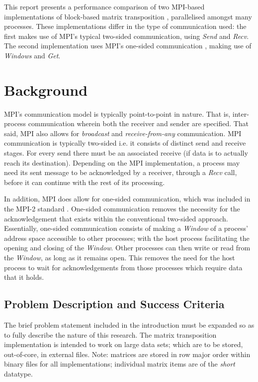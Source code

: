 \documentclass[journal,10pt,a4paper]{IEEEtran}
\begin{document}
This report presents a performance comparison of two MPI-based implementations of block-based matrix transposition \cite{transp}, parallelised amongst many processes. These implementations differ in the type of communication used: the first makes use of MPI's typical two-sided communication, using \textit{Send} and \textit{Recv}. The second implementation uses MPI's one-sided communication \cite{one}, making use of \textit{Windows} and \textit{Get}.

\section{Background}

MPI's communication model is typically point-to-point in nature. That is, inter-process communication wherein both the receiver and sender are specified. That said, MPI also allows for \textit{broadcast} and \textit{receive-from-any} communication. MPI communication is typically two-sided i.e. it consists of distinct send and receive stages. For every send there must be an associated receive (if data is to actually reach its destination). Depending on the MPI implementation, a process may need its sent message to be acknowledged by a receiver, through a \textit{Recv} call, before it can continue with the rest of its processing.

In addition, MPI does allow for one-sided communication, which was included in the MPI-2 standard \cite{one,one1}. One-sided communication removes the necessity for the acknowledgement that exists within the conventional two-sided approach. Essentially, one-sided communication consists of making a \textit{Window} of a process' address space accessible to other processes; with the host process facilitating the opening and closing of the \textit{Window}. Other processes can then write or read from the \textit{Window}, as long as it remains open. This removes the need for the host process to wait for acknowledgements from those processes which require data that it holds.


\subsection{Problem Description and Success Criteria}

The brief problem statement included in the introduction must be expanded so as to fully describe the nature of this research. The matrix transposition implementation is intended to work on large data sets; which are to be stored, out-of-core, in external files. Note: matrices are stored in row major order within binary files for all implementations; individual matrix items are of the \textit{short} datatype.
\end{document}
